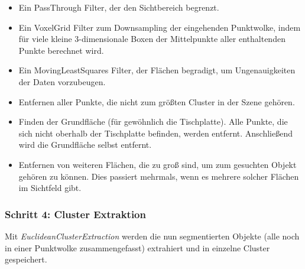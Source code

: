 \documentclass{suturo}
\begin{document}
\begin{itemize} 
\item Ein PassThrough Filter, der den Sichtbereich begrenzt.
\item Ein VoxelGrid Filter zum Downsampling der eingehenden Punktwolke, indem für viele kleine 3-dimensionale Boxen der Mittelpunkte aller enthaltenden Punkte berechnet wird.
\item Ein MovingLeastSquares Filter, der Flächen begradigt, um Ungenauigkeiten der Daten vorzubeugen.
\item Entfernen aller Punkte, die nicht zum größten Cluster in der Szene gehören.
\item Finden der Grundfläche (für gewöhnlich die Tischplatte). Alle Punkte, die sich nicht oberhalb der Tischplatte befinden, werden entfernt. Anschließend wird die Grundfläche selbst entfernt.

\begin{figure}[!htb]
\end{figure}

\item Entfernen von weiteren Flächen, die zu groß sind, um zum gesuchten Objekt gehören zu können. Dies passiert mehrmals, wenn es mehrere solcher Flächen im Sichtfeld gibt.
\end{itemize}

\subsubsection{Schritt 4: Cluster Extraktion}
Mit \textit{EuclideanClusterExtraction} werden die nun segmentierten Objekte (alle noch in einer Punktwolke zusammengefasst) extrahiert und in einzelne Cluster gespeichert.

\begin{figure}[!htb]
\end{figure}
\end{document}
